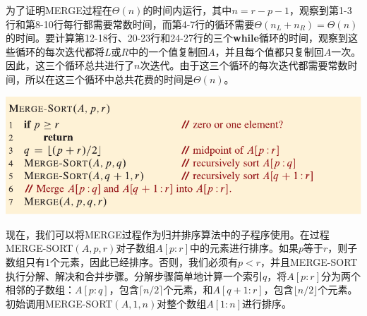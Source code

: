 \documentclass[lang=cn,newtx,10pt,scheme=chinese]{elegantbook}
\begin{document}
为了证明MERGE过程在$\Theta(n)$的时间内运行，其中$n=r-p-1$，观察到第1-3行和第8-10行每行都需要常数时间，而第4-7行的循环需要$\Theta(n_L+n_R)=\Theta(n)$的时间。要计算第12-18行、20-23行和24-27行的三个\textbf{while}循环的时间，观察到这些循环的每次迭代都将$L$或$R$中的一个值复制回$A$，并且每个值都只复制回$A$一次。因此，这三个循环总共进行了$n$次迭代。由于这三个循环的每次迭代都需要常数时间，所以在这三个循环中总共花费的时间是$\Theta(n)$。

\includegraphics{算法导论第四版插图/第二章/归并排序主程序.pdf}

现在，我们可以将MERGE过程作为归并排序算法中的子程序使用。在过程MERGE-SORT$(A,p,r)$对子数组$A[p:r]$中的元素进行排序。如果$p$等于$r$，则子数组只有1个元素，因此已经排序。否则，我们必须有$p < r$，并且MERGE-SORT执行分解、解决和合并步骤。分解步骤简单地计算一个索引$q$，将$A[p:r]$分为两个相邻的子数组：$A[p:q]$，包含$\lceil{n/2}\rceil$个元素，和$A[q+1:r]$，包含$\lfloor{n/2}\rfloor$个元素。初始调用MERGE-SORT$(A,1,n)$对整个数组$A[1:n]$进行排序。
\end{document}
